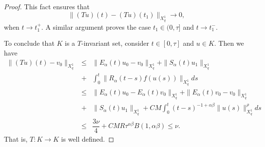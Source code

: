 \documentclass[12pt,reqno]{amsart}
\begin{document}
\begin{proof}
	This fact ensures that
	$$\|(Tu)(t)-(Tu)(t_1)\|_{X^{1}_{q}}\rightarrow 0,$$
	when $t\rightarrow t_1^+$. A similar argument proves the case $t_1 \in(0,\tau]$ and  $t\rightarrow t_1^-$.
	
	To conclude that $K$ is a $T$-invariant set, consider $t\in [0,\tau]$ and $u\in K$. Then we have
	\begin{eqnarray*}
		\|(Tu)(t)-v_0\|_{X^{1}_{q}}&\leq& \|E_{\alpha}(t)u_0-v_0\|_{X^{1}_{q}} + \|S_{\alpha}(t)u_1\|_{X^{1}_{q}}\\
		&+& \int_{0}^{t}\|R_{\alpha}(t-s)f(u(s))\|_{X^{1}_{q}} ds\\
		&\leq& \|E_{\alpha}(t)u_0-E_{\alpha}(t)v_0\|_{X^{1}_{q}}+\|E_{\alpha}(t)v_0-v_0\|_{X^{1}_{q}}\\
		&+& \|S_{\alpha}(t)u_1\|_{X^{1}_{q}} + CM\int_{0}^{t}(t-s)^{-1+\alpha\beta}\|u(s)\|_{X^{1}_{q}}^{\rho}ds\\
		&\leq&  \dfrac{3\nu}{4}+ CMR\tau^{\alpha\beta}B(1, \alpha\beta)\le \nu.
	\end{eqnarray*}
	That is, $T: K\to K$ is well defined.
	

\end{proof}
\end{document}
